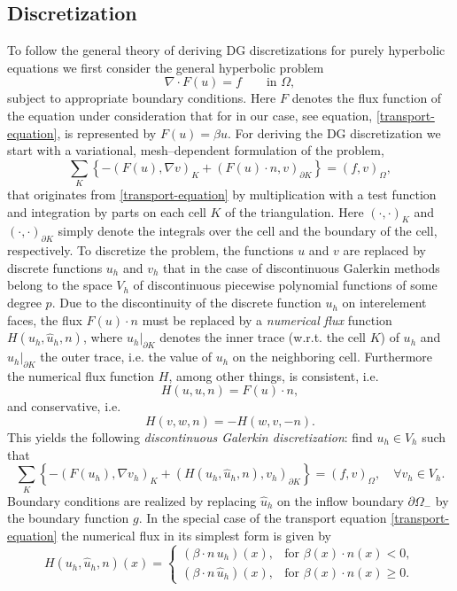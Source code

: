 \documentclass[11pt]{article}
\begin{document}
\subsection{Discretization}
To follow the general theory of deriving DG discretizations for purely
hyperbolic equations we first consider the general hyperbolic problem
\[
  \nabla\cdot F(u)=f  \qquad\mbox{in }\Omega,
\]
subject to appropriate boundary conditions. Here $F$ denotes the flux
function of the equation under consideration that for in our case, see equation,
\eqref{transport-equation}, is represented by $F(u)=\beta u$. For
deriving the DG discretization we start with a variational,
mesh--dependent formulation of the problem,
\[
  \sum_K\left\{-(F(u),\nabla v)_K+(F(u)\cdot n, v)_{\partial K}\right\}=(f,v)_\Omega,
\]
that originates from \eqref{transport-equation} by multiplication with
a test function and integration by parts on each cell $K$ of the
triangulation. Here $(\cdot, \cdot)_K$ and $(\cdot, \cdot)_{\partial
  K}$ simply denote the integrals over the cell and the boundary of
the cell, respectively. To discretize the problem, the functions $u$
and $v$ are replaced by discrete functions $u_h$ and $v_h$ that in the
case of discontinuous Galerkin methods belong to the space $V_h$ of
discontinuous piecewise polynomial functions of some degree $p$. Due
to the discontinuity of the discrete function $u_h$ on interelement
faces, the flux $F(u)\cdot n$ must be replaced by a \emph{numerical
  flux} function $H(u_h, \hat u_h, n)$, where $u_h|_{\partial K}$
denotes the inner trace (w.r.t.  the cell $K$) of $u_h$ and $\hat
u_h|_{\partial K}$ the outer trace, i.e. the value of $u_h$ on the
neighboring cell. Furthermore the numerical flux function $H$, among
other things, is consistent, i.e.
\[
H(u,u,n)=F(u)\cdot n,
\]
and conservative, i.e.
\begin{equation}\label{conservative}
H(v,w,n)=-H(w,v,-n).
\end{equation}
This yields the following \emph{discontinuous Galerkin
  discretization}: find $u_h\in V_h$ such that
\begin{equation}\label{dg-scheme}
  \sum_K\left\{-(F(u_h),\nabla v_h)_K+(H(u_h,\hat u_h,n), v_h)_{\partial K}\right\}=(f,v)_\Omega, \quad\forall v_h\in V_h.
\end{equation}
Boundary conditions are realized by replacing $\hat u_h$ on the inflow boundary $\partial\Omega_-$ by the boundary function $g$.
In the special case of the transport equation
\eqref{transport-equation} the numerical flux in its simplest form
is given by
\begin{equation}\label{flux-transport-equation}
  H(u_h,\hat u_h,n)(x)=\left\{\begin{array}{ll}
      (\beta\cdot n\, u_h)(x),&\mbox{for } \beta(x)\cdot n(x)<0,\\
      (\beta\cdot n\, \hat u_h)(x),&\mbox{for } \beta(x)\cdot n(x)\geq 0.
\end{array}
\right.
\end{equation}
\end{document}
